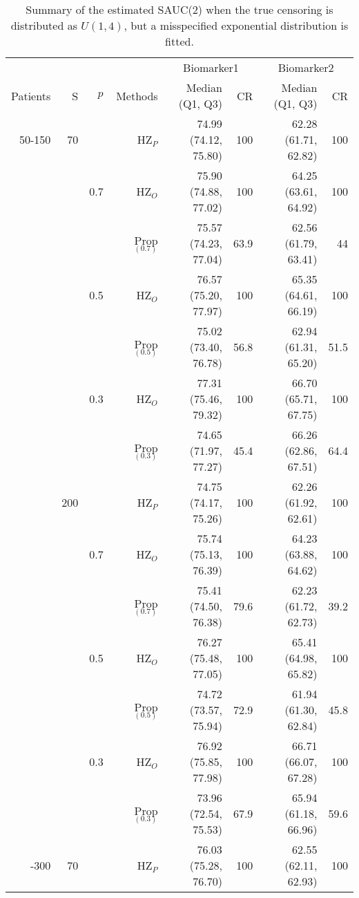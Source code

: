 \begin{table}[!htb]

\caption{\label{tab:tab1}Summary of the estimated SAUC(2) when the true censoring is distributed as $U(1,4)$, but a misspecified exponential distribution is fitted.}
\centering
\begin{threeparttable}
\begin{tabular}[t]{rrrrrrrr}
\toprule
\multicolumn{1}{c}{} & \multicolumn{1}{c}{} & \multicolumn{1}{c}{} & \multicolumn{1}{c}{} & \multicolumn{2}{c}{Biomarker1} & \multicolumn{2}{c}{Biomarker2} \\
\cmidrule(l{3pt}r{3pt}){5-6} \cmidrule(l{3pt}r{3pt}){7-8}
Patients & S & $p$ & Methods & Median (Q1, Q3) & CR & Median (Q1, Q3) & CR\\
\midrule
50-150 & 70 &  & HZ$_P$ & 74.99 (74.12, 75.80) & 100 & 62.28 (61.71, 62.82) & 100\\
 &  & 0.7 & HZ$_O$ & 75.90 (74.88, 77.02) & 100 & 64.25 (63.61, 64.92) & 100\\
 &  &  & Prop$_{(0.7)}$ & 75.57 (74.23, 77.04) & 63.9 & 62.56 (61.79, 63.41) & 44\\
 &  & 0.5 & HZ$_O$ & 76.57 (75.20, 77.97) & 100 & 65.35 (64.61, 66.19) & 100\\
 &  &  & Prop$_{(0.5)}$ & 75.02 (73.40, 76.78) & 56.8 & 62.94 (61.31, 65.20) & 51.5\\
 &  & 0.3 & HZ$_O$ & 77.31 (75.46, 79.32) & 100 & 66.70 (65.71, 67.75) & 100\\
 &  &  & Prop$_{(0.3)}$ & 74.65 (71.97, 77.27) & 45.4 & 66.26 (62.86, 67.51) & 64.4\\
\addlinespace
 & 200 &  & HZ$_P$ & 74.75 (74.17, 75.26) & 100 & 62.26 (61.92, 62.61) & 100\\
 &  & 0.7 & HZ$_O$ & 75.74 (75.13, 76.39) & 100 & 64.23 (63.88, 64.62) & 100\\
 &  &  & Prop$_{(0.7)}$ & 75.41 (74.50, 76.38) & 79.6 & 62.23 (61.72, 62.73) & 39.2\\
 &  & 0.5 & HZ$_O$ & 76.27 (75.48, 77.05) & 100 & 65.41 (64.98, 65.82) & 100\\
 &  &  & Prop$_{(0.5)}$ & 74.72 (73.57, 75.94) & 72.9 & 61.94 (61.30, 62.84) & 45.8\\
 &  & 0.3 & HZ$_O$ & 76.92 (75.85, 77.98) & 100 & 66.71 (66.07, 67.28) & 100\\
 &  &  & Prop$_{(0.3)}$ & 73.96 (72.54, 75.53) & 67.9 & 65.94 (61.18, 66.96) & 59.6\\
\addlinespace
50-300 & 70 &  & HZ$_P$ & 76.03 (75.28, 76.70) & 100 & 62.55 (62.11, 62.93) & 100\\

\end{tabular}
\end{threeparttable}
\end{table}
